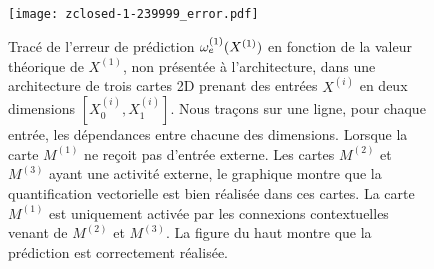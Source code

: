 \documentclass[../main]{subfiles}
\begin{document}
\begin{figure}
\texttt{[image: zclosed-1-239999\_error.pdf]}
\caption{Tracé de l'erreur de prédiction $\omega_e^{({1})}(X^{({1})})$ en fonction de la valeur théorique de $X^{(1)}$, non présentée à l'architecture, dans une architecture de trois cartes 2D prenant des entrées $X^{(i)}$ en deux dimensions $[X^{(i)}_0, X^{(i)}_1]$. Nous traçons sur une ligne, pour chaque entrée, les dépendances entre chacune des dimensions.
Lorsque la carte $M^{(1)}$ ne reçoit pas d'entrée externe. Les cartes $M^{(2)}$ et $M^{(3)}$ ayant une activité externe, le graphique montre que la quantification vectorielle est bien réalisée dans ces cartes. La carte $M^{(1)}$ est uniquement activée par les connexions contextuelles venant de $M^{(2)}$ et $M^{(3)}$. La figure du haut montre que la prédiction est correctement réalisée.}
\end{figure}
\end{document}
